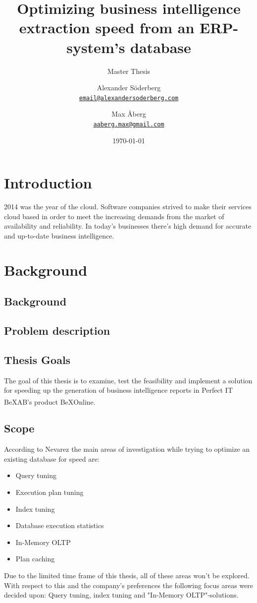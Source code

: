 \documentclass{cslthse-msc}
\author{
	Alexander Söderberg \\
	{\normalsize \href{mailto:email@alexandersoderberg.com}{\texttt{email@alexandersoderberg.com}}}
	\and
	Max Åberg \\
    {\normalsize \href{mailto:aaberg.max@gmail.com}{\texttt{aaberg.max@gmail.com}}}
}
\title{Optimizing business intelligence
extraction speed from an
ERP-system’s database}
\subtitle{Master Thesis}
\date{\today}
\newcommand{\bex}{BeX\textsuperscript{\textregistered}}
\begin{document}
\makefrontmatter
\chapter[Introduction]{Introduction}
2014 was the year of the cloud. Software companies strived to make their services cloud based in order to meet the increasing demands from the market of availability and reliability. 
In today's businesses there's high demand for accurate and up-to-date business intelligence.

\chapter{Background}

\section{Background}

\section{Problem description}

\section{Thesis Goals}
The goal of this thesis is to examine, test the feasibility and implement a solution for speeding up the generation of business intelligence reports in Perfect IT \bex AB's product \bex Online. 
\section{Scope}
According to Nevarez \cite{Nevarez} the main areas of investigation while trying to optimize an existing database for speed are:
\begin{itemize}
\item Query tuning
\item Execution plan tuning
\item Index tuning
\item Database execution statistics
\item In-Memory OLTP
\item Plan caching
\end{itemize}
Due to the limited time frame of this thesis, all of these areas won't be explored. With respect to this and the company's preferences the following focus areas were decided upon: Query tuning, index tuning and "In-Memory OLTP"-solutions.
\end{document}
